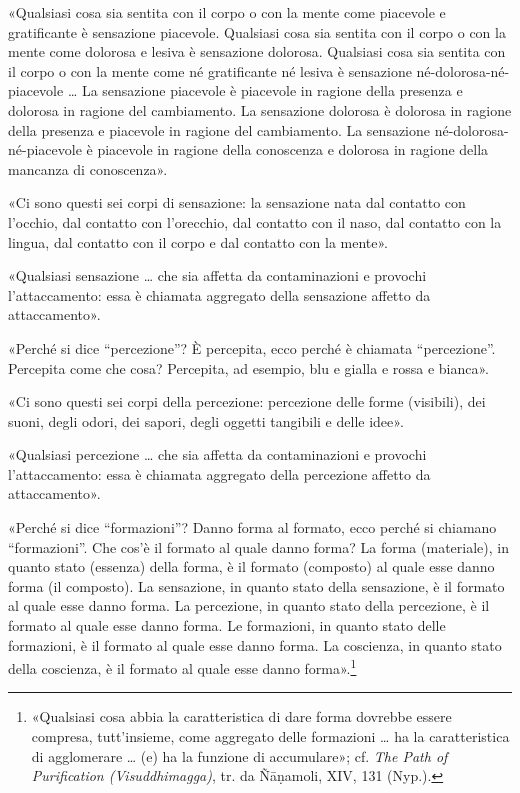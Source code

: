 

«Qualsiasi cosa sia sentita con il corpo o con la mente come piacevole e
gratificante è sensazione piacevole. Qualsiasi cosa sia sentita con il
corpo o con la mente come dolorosa e lesiva è sensazione dolorosa.
Qualsiasi cosa sia sentita con il corpo o con la mente come né
gratificante né lesiva è sensazione né-dolorosa-né-piacevole … La
sensazione piacevole è piacevole in ragione della presenza e dolorosa in
ragione del cambiamento. La sensazione dolorosa è dolorosa in ragione
della presenza e piacevole in ragione del cambiamento. La sensazione
né-dolorosa-né-piacevole è piacevole in ragione della conoscenza e
dolorosa in ragione della mancanza di conoscenza».




«Ci sono questi sei corpi di sensazione: la sensazione nata dal contatto
con l’occhio, dal contatto con l’orecchio, dal contatto con il naso, dal
contatto con la lingua, dal contatto con il corpo e dal contatto con la
mente».




«Qualsiasi sensazione … che sia affetta da contaminazioni e provochi
l’attaccamento: essa è chiamata aggregato della sensazione affetto da
attaccamento».




«Perché si dice “percezione”? È percepita, ecco perché è chiamata
“percezione”. Percepita come che cosa? Percepita, ad esempio, blu e
gialla e rossa e bianca».




«Ci sono questi sei corpi della percezione: percezione delle forme
(visibili), dei suoni, degli odori, dei sapori, degli oggetti tangibili
e delle idee».




«Qualsiasi percezione … che sia affetta da contaminazioni e provochi
l’attaccamento: essa è chiamata aggregato della percezione affetto da
attaccamento».




«Perché si dice “formazioni”? Danno forma al formato, ecco perché si
chiamano “formazioni”. Che cos’è il formato al quale danno forma? La
forma (materiale), in quanto stato (essenza) della forma, è il formato
(composto) al quale esse danno forma (il composto). La sensazione, in
quanto stato della sensazione, è il formato al quale esse danno forma.
La percezione, in quanto stato della percezione, è il formato al quale
esse danno forma. Le formazioni, in quanto stato delle formazioni, è il
formato al quale esse danno forma. La coscienza, in quanto stato della
coscienza, è il formato al quale esse danno forma».\footnote{«Qualsiasi cosa abbia la caratteristica di dare forma dovrebbe essere compresa, tutt’insieme, come aggregato delle formazioni … ha la caratteristica di agglomerare … (e) ha la funzione di accumulare»; cf. \emph{The Path of Purification (Visuddhimagga)}, tr. da Ñāṇamoli, XIV, 131 (Nyp.).}


